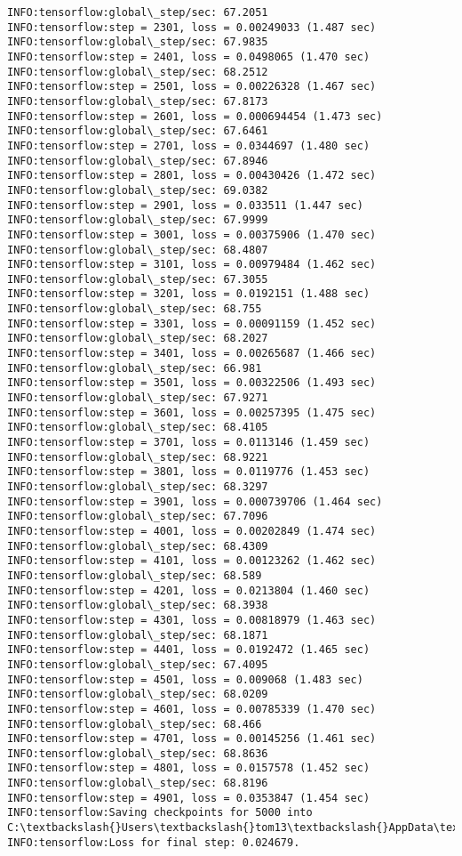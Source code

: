 \documentclass[11pt]{article}
\begin{document}
\begin{Verbatim}[commandchars=\\\{\}]
INFO:tensorflow:global\_step/sec: 67.2051
INFO:tensorflow:step = 2301, loss = 0.00249033 (1.487 sec)
INFO:tensorflow:global\_step/sec: 67.9835
INFO:tensorflow:step = 2401, loss = 0.0498065 (1.470 sec)
INFO:tensorflow:global\_step/sec: 68.2512
INFO:tensorflow:step = 2501, loss = 0.00226328 (1.467 sec)
INFO:tensorflow:global\_step/sec: 67.8173
INFO:tensorflow:step = 2601, loss = 0.000694454 (1.473 sec)
INFO:tensorflow:global\_step/sec: 67.6461
INFO:tensorflow:step = 2701, loss = 0.0344697 (1.480 sec)
INFO:tensorflow:global\_step/sec: 67.8946
INFO:tensorflow:step = 2801, loss = 0.00430426 (1.472 sec)
INFO:tensorflow:global\_step/sec: 69.0382
INFO:tensorflow:step = 2901, loss = 0.033511 (1.447 sec)
INFO:tensorflow:global\_step/sec: 67.9999
INFO:tensorflow:step = 3001, loss = 0.00375906 (1.470 sec)
INFO:tensorflow:global\_step/sec: 68.4807
INFO:tensorflow:step = 3101, loss = 0.00979484 (1.462 sec)
INFO:tensorflow:global\_step/sec: 67.3055
INFO:tensorflow:step = 3201, loss = 0.0192151 (1.488 sec)
INFO:tensorflow:global\_step/sec: 68.755
INFO:tensorflow:step = 3301, loss = 0.00091159 (1.452 sec)
INFO:tensorflow:global\_step/sec: 68.2027
INFO:tensorflow:step = 3401, loss = 0.00265687 (1.466 sec)
INFO:tensorflow:global\_step/sec: 66.981
INFO:tensorflow:step = 3501, loss = 0.00322506 (1.493 sec)
INFO:tensorflow:global\_step/sec: 67.9271
INFO:tensorflow:step = 3601, loss = 0.00257395 (1.475 sec)
INFO:tensorflow:global\_step/sec: 68.4105
INFO:tensorflow:step = 3701, loss = 0.0113146 (1.459 sec)
INFO:tensorflow:global\_step/sec: 68.9221
INFO:tensorflow:step = 3801, loss = 0.0119776 (1.453 sec)
INFO:tensorflow:global\_step/sec: 68.3297
INFO:tensorflow:step = 3901, loss = 0.000739706 (1.464 sec)
INFO:tensorflow:global\_step/sec: 67.7096
INFO:tensorflow:step = 4001, loss = 0.00202849 (1.474 sec)
INFO:tensorflow:global\_step/sec: 68.4309
INFO:tensorflow:step = 4101, loss = 0.00123262 (1.462 sec)
INFO:tensorflow:global\_step/sec: 68.589
INFO:tensorflow:step = 4201, loss = 0.0213804 (1.460 sec)
INFO:tensorflow:global\_step/sec: 68.3938
INFO:tensorflow:step = 4301, loss = 0.00818979 (1.463 sec)
INFO:tensorflow:global\_step/sec: 68.1871
INFO:tensorflow:step = 4401, loss = 0.0192472 (1.465 sec)
INFO:tensorflow:global\_step/sec: 67.4095
INFO:tensorflow:step = 4501, loss = 0.009068 (1.483 sec)
INFO:tensorflow:global\_step/sec: 68.0209
INFO:tensorflow:step = 4601, loss = 0.00785339 (1.470 sec)
INFO:tensorflow:global\_step/sec: 68.466
INFO:tensorflow:step = 4701, loss = 0.00145256 (1.461 sec)
INFO:tensorflow:global\_step/sec: 68.8636
INFO:tensorflow:step = 4801, loss = 0.0157578 (1.452 sec)
INFO:tensorflow:global\_step/sec: 68.8196
INFO:tensorflow:step = 4901, loss = 0.0353847 (1.454 sec)
INFO:tensorflow:Saving checkpoints for 5000 into C:\textbackslash{}Users\textbackslash{}tom13\textbackslash{}AppData\textbackslash{}Local\textbackslash{}Temp\textbackslash{}tmp97az0nju\textbackslash{}model.ckpt.
INFO:tensorflow:Loss for final step: 0.024679.

    \end{Verbatim}
\end{document}
